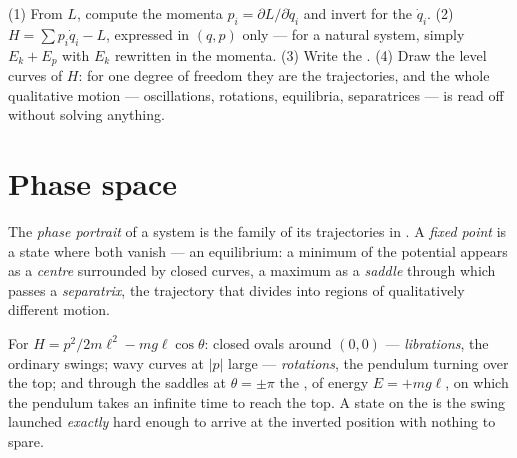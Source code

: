 \begin{method}\label{met:b3:hamiltonian-mechanics:recipe}
(1) From $L$, compute the momenta $p_i = \partial L/\partial\dot q_i$
and invert for the $\dot q_i$. (2) $H = \sum p_i\dot q_i - L$,
expressed in $(q, p)$ only --- for a natural system, simply $E_k + E_p$
with $E_k$ rewritten in the momenta. (3) Write the . (4) Draw the level curves of $H$: for one degree of
freedom they are the trajectories, and the whole qualitative motion
--- oscillations, rotations, equilibria, separatrices --- is read off
without solving anything.
\end{method}

\section{Phase space}

\begin{definition}\label{def:b3:hamiltonian-mechanics:portrait}
The \emph{phase portrait} of a system is the family of its
trajectories in . A \emph{fixed point} is a state where
both  vanish --- an equilibrium: a minimum of the
potential appears as a \emph{centre} surrounded by closed curves, a
maximum as a \emph{saddle} through which passes a \emph{separatrix},
the trajectory that divides  into regions of qualitatively
different motion.
\end{definition}

\begin{example}\label{ex:b3:hamiltonian-mechanics:pendulum-portrait}
For $H = p^2/2m\ell^2 - mg\ell\cos\theta$: closed ovals around
$(0, 0)$ --- \emph{librations}, the ordinary swings; wavy curves at
$|p|$ large --- \emph{rotations}, the pendulum turning over the top;
and through the saddles at $\theta = \pm\pi$ the , of energy
$E = +mg\ell$, on which the pendulum takes an infinite time to reach
the top. A state on the  is the swing launched \emph{exactly}
hard enough to arrive at the inverted position with nothing to spare.
\end{example}

